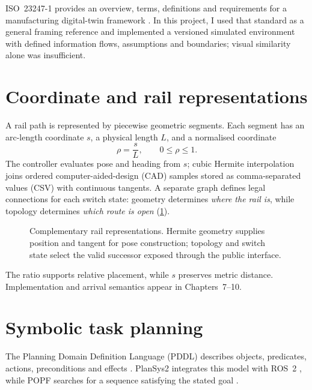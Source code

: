 ISO~23247-1 provides an overview, terms, definitions and requirements for a
manufacturing digital-twin framework \citep{iso23247}. In this project, I used
that standard as a general framing reference and implemented a versioned
simulated environment with defined information flows, assumptions and
boundaries; visual similarity alone was insufficient.

\section{Coordinate and rail representations}

A rail path is represented by piecewise geometric segments. Each segment has
an arc-length coordinate \(s\), a physical length \(L\), and a normalised
coordinate
\begin{equation}
  \rho = \frac{s}{L}, \qquad 0 \leq \rho \leq 1 .
  \label{eq:sratio}
\end{equation}
The controller evaluates pose and heading from $s$; cubic Hermite
interpolation joins ordered computer-aided-design (CAD) samples stored as
comma-separated values (CSV) with continuous
tangents. A separate graph defines legal connections for each switch state:
geometry determines \emph{where the rail is}, while topology determines
\emph{which route is open} (\cref{fig:geometry-versus-topology}).

\begin{figure}[H]
  \centering
  \resizebox{0.96\textwidth}{!}{}
  \caption[Geometry and topology as complementary rail representations.]
  {Complementary rail representations. Hermite geometry supplies
  position and tangent for pose construction; topology and switch state select
  the valid successor exposed through the public interface.}
  \label{fig:geometry-versus-topology}
\end{figure}

The ratio supports relative placement, while $s$ preserves metric distance.
Implementation and arrival semantics appear in Chapters~7--10.

\section{Symbolic task planning}

The Planning Domain Definition Language (PDDL) describes objects, predicates,
actions, preconditions and effects \citep{pddl}. PlanSys2 integrates this model
with ROS~2 \citep{plansys2}, while POPF searches for a sequence satisfying the
stated goal \citep{popf}.

